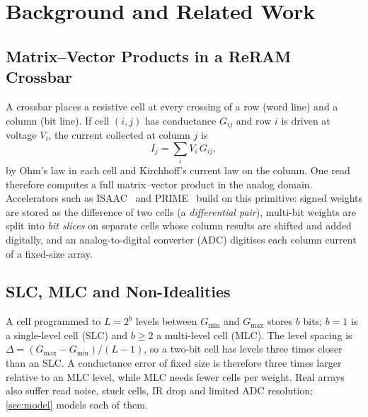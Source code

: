 \section{Background and Related Work}\label{sec:background}

\subsection{Matrix--Vector Products in a ReRAM Crossbar}
A crossbar places a resistive cell at every crossing of a row (word line) and a column (bit line). If
cell $(i,j)$ has conductance $G_{ij}$ and row $i$ is driven at voltage $V_i$, the current collected at
column $j$ is
\begin{equation}
I_j=\sum_i V_i\,G_{ij},
\label{eq:crossbar}
\end{equation}
by Ohm's law in each cell and Kirchhoff's current law on the column. One read therefore computes a full
matrix--vector product in the analog domain. Accelerators such as ISAAC~\cite{shafiee2016isaac} and
PRIME~\cite{chi2016prime} build on this primitive: signed weights are stored as the difference of two
cells (a \emph{differential pair}), multi-bit weights are split into \emph{bit slices} on separate cells
whose column results are shifted and added digitally, and an analog-to-digital converter (ADC) digitises
each column current of a fixed-size array.

\subsection{SLC, MLC and Non-Idealities}
A cell programmed to $L=2^b$ levels between $G_{\min}$ and $G_{\max}$ stores $b$ bits; $b=1$ is a
single-level cell (SLC) and $b\geq2$ a multi-level cell (MLC). The level spacing is
$\Delta=(G_{\max}-G_{\min})/(L-1)$, so a two-bit cell has levels three times closer than an SLC. A
conductance error of fixed size is therefore three times larger relative to an MLC level, while MLC
needs fewer cells per weight. Real arrays also suffer read noise, stuck cells, IR drop and limited ADC
resolution; \cref{sec:model} models each of them.

